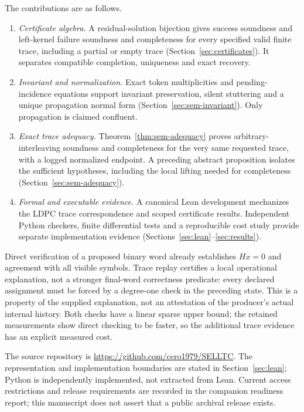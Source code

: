 \documentclass{lmcs}
\newcommand{\RepoURL}{\url{https://github.com/cero1979/SELLTC}}
\begin{document}
The contributions are as follows.
\begin{enumerate}
\item \emph{Certificate algebra.} A residual-solution bijection gives
success soundness and left-kernel failure soundness and completeness for
every specified valid finite trace, including a partial or empty trace
(Section~\ref{sec:certificates}). It separates compatible completion,
uniqueness and exact recovery.
\item \emph{Invariant and normalization.} Exact token
multiplicities and pending-incidence equations support invariant
preservation, silent stuttering and a unique propagation normal form
(Section~\ref{sec:sem-invariant}). Only propagation is claimed confluent.
\item \emph{Exact trace adequacy.} Theorem~\ref{thm:sem-adequacy} proves
arbitrary-interleaving soundness and completeness for the very same
requested trace, with a logged normalized endpoint. A preceding abstract
proposition isolates the sufficient hypotheses, including the local
lifting needed for completeness (Section~\ref{sec:sem-adequacy}).
\item \emph{Formal and executable evidence.} A canonical Lean development
mechanizes the LDPC trace correspondence and scoped certificate results.
Independent Python checkers, finite differential tests and a reproducible
cost study provide separate implementation evidence
(Sections~\ref{sec:lean}--\ref{sec:results}).
\end{enumerate}

Direct verification of a proposed binary word already establishes
$Hx=0$ and agreement with all visible symbols. Trace replay certifies a
local operational explanation, not a stronger final-word correctness
predicate: every declared assignment must be forced by a degree-one check
in the preceding state. This is a property of the supplied explanation,
not an attestation of the producer's actual internal history. Both checks
have a linear sparse upper bound; the retained measurements show direct
checking to be faster, so the additional trace evidence has an explicit
measured cost.

The source repository is \RepoURL. The representation and implementation
boundaries are stated in Section~\ref{sec:lean}; Python is independently
implemented, not extracted from Lean. Current access restrictions and
release requirements are recorded in the companion readiness report;
this manuscript does not assert that a public archival release exists.
\end{document}
